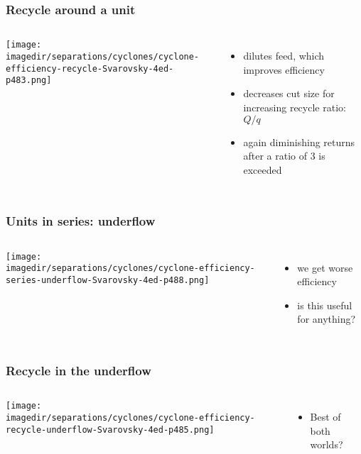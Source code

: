 \begin{frame}\frametitle{Recycle around a unit}
	\begin{columns}[c]
			\begin{center}
				\texttt{[image: \\imagedir/separations/cyclones/cyclone-efficiency-recycle-Svarovsky-4ed-p483.png]}
			\end{center}
			\begin{itemize}
				\item	dilutes feed, which improves efficiency
				\item	decreases cut size for increasing recycle ratio: $Q/q$
				\item	again diminishing returns after a ratio of 3 is exceeded
			\end{itemize}
	\end{columns}
\end{frame}

\begin{frame}\frametitle{Units in series: underflow}
	\begin{columns}[t]
			\begin{center}
				\texttt{[image: \\imagedir/separations/cyclones/cyclone-efficiency-series-underflow-Svarovsky-4ed-p488.png]}
			\end{center}
		\begin{itemize}
			\item	we get worse efficiency
			\item	is this useful for anything?
		\end{itemize}
	\end{columns}
\end{frame}

\begin{frame}\frametitle{Recycle in the underflow}
	\begin{columns}[t]
			\begin{center}
				\texttt{[image: \\imagedir/separations/cyclones/cyclone-efficiency-recycle-underflow-Svarovsky-4ed-p485.png]}
			\end{center}
		\begin{itemize}
			\item	Best of both worlds?
		\end{itemize}
	\end{columns}
\end{frame}

